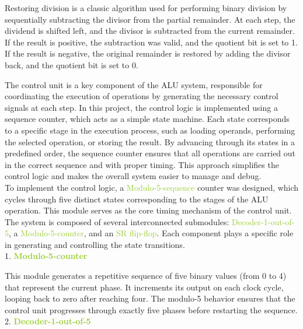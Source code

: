 \documentclass[12pt, letterpaper]{article}
\begin{document}
Restoring division is a classic algorithm used for performing binary division by sequentially subtracting the divisor from the partial remainder. At each step, the dividend is shifted left, and the divisor is subtracted from the
current remainder. If the result is positive, the subtraction was valid, and the quotient bit is set to 1. If the result is negative, the original remainder is restored by adding the divisor back, and the quotient bit is set to 0.\\



The control unit is a key component of the ALU system, responsible for coordinating the execution of operations by generating the necessary control signals at each step. In this project, the control logic is implemented using a
sequence counter, which acts as a simple state machine. Each state corresponds to a specific stage in the execution process, such as loading operands, performing the selected operation, or storing the result. By advancing through
its states in a predefined order, the sequence counter ensures that all operations are carried out in the correct sequence and with proper timing. This approach simplifies the control logic and makes the overall system easier to
manage and debug.\\

To implement the control logic, a \textcolor{YellowGreen}{Modulo-5-sequence} counter was designed, which cycles through five distinct states corresponding to the stages of the ALU operation.
This module serves as the core timing mechanism of the control
unit. The system is composed of several interconnected submodules:
\textcolor{YellowGreen}{Decoder-1-out-of-5}, a \textcolor{YellowGreen}{Modulo-5-counter}, and an \textcolor{YellowGreen}{SR flip-flop}. Each component plays a specific role in generating and controlling the state transitions.\\

1. \textcolor{YellowGreen}{\textbf{Modulo-5-counter}}

This module generates a repetitive sequence of five binary values (from 0 to 4) that represent the current phase. It increments its output on each clock cycle, looping back to zero after reaching four. The modulo-5 behavior
ensures that the control unit progresses through exactly five phases before restarting the sequence.\\

2. \textcolor{YellowGreen}{\textbf{Decoder-1-out-of-5}}
\end{document}
